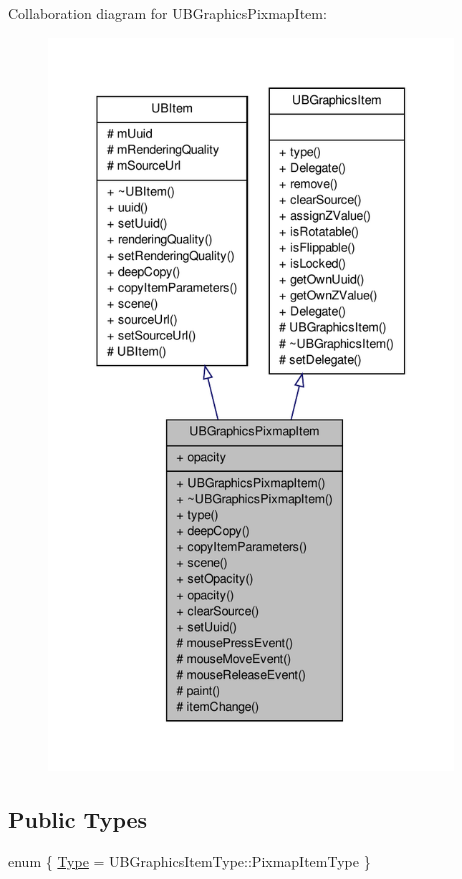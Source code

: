Collaboration diagram for U\-B\-Graphics\-Pixmap\-Item\-:
\nopagebreak
\begin{figure}[H]
\begin{center}
\leavevmode
\includegraphics[height=550pt]{d9/d75/class_u_b_graphics_pixmap_item__coll__graph}
\end{center}
\end{figure}
\subsection*{Public Types}
\begin{DoxyCompactItemize}
\item 
enum \{ \hyperlink{class_u_b_graphics_pixmap_item_a612805b803119f668ea68c9e88b707e2a870750b87c139662862166e210a46810}{Type} =  U\-B\-Graphics\-Item\-Type\-:\-:Pixmap\-Item\-Type
 \}
\end{DoxyCompactItemize}
